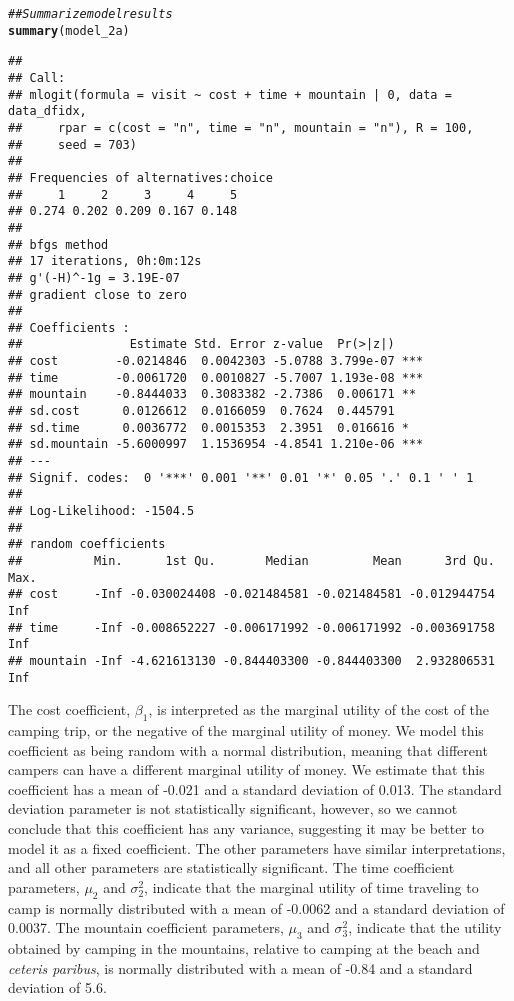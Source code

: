 \documentclass[11pt,letterpaper]{article}\usepackage[]{graphicx}\usepackage[]{color}
\makeatletter
\newcommand{\hlcom}[1]{\textcolor[rgb]{0.678,0.584,0.686}{\textit{#1}}}%
\newcommand{\hlstd}[1]{\textcolor[rgb]{0.345,0.345,0.345}{#1}}%
\newcommand{\hlkwd}[1]{\textcolor[rgb]{0.737,0.353,0.396}{\textbf{#1}}}%
\newenvironment{kframe}{%
 \def\at@end@of@kframe{}%
 \ifinner\ifhmode%
  \def\at@end@of@kframe{\end{minipage}}%
  \begin{minipage}{\columnwidth}%
 \fi\fi%
 \def\FrameCommand##1{\hskip\@totalleftmargin \hskip-\fboxsep
 \colorbox{shadecolor}{##1}\hskip-\fboxsep
     \hskip-\linewidth \hskip-\@totalleftmargin \hskip\columnwidth}%
 \MakeFramed {\advance\hsize-\width
   \@totalleftmargin\z@ \linewidth\hsize
   \@setminipage}}%
 {\par\unskip\endMakeFramed%
 \at@end@of@kframe}
\newenvironment{knitrout}{}{} %
\makeatother
\begin{document}
\begin{enumerate}[label=\alph*., leftmargin=*]
\begin{enumerate}[label=\roman*.]
\begin{knitrout}
\color{fgcolor}\begin{kframe}
\begin{alltt}
\hlcom{## Summarize model results}
\hlkwd{summary}\hlstd{(model_2a)}
\end{alltt}
\begin{verbatim}
## 
## Call:
## mlogit(formula = visit ~ cost + time + mountain | 0, data = data_dfidx, 
##     rpar = c(cost = "n", time = "n", mountain = "n"), R = 100, 
##     seed = 703)
## 
## Frequencies of alternatives:choice
##     1     2     3     4     5 
## 0.274 0.202 0.209 0.167 0.148 
## 
## bfgs method
## 17 iterations, 0h:0m:12s 
## g'(-H)^-1g = 3.19E-07 
## gradient close to zero 
## 
## Coefficients :
##               Estimate Std. Error z-value  Pr(>|z|)    
## cost        -0.0214846  0.0042303 -5.0788 3.799e-07 ***
## time        -0.0061720  0.0010827 -5.7007 1.193e-08 ***
## mountain    -0.8444033  0.3083382 -2.7386  0.006171 ** 
## sd.cost      0.0126612  0.0166059  0.7624  0.445791    
## sd.time      0.0036772  0.0015353  2.3951  0.016616 *  
## sd.mountain -5.6000997  1.1536954 -4.8541 1.210e-06 ***
## ---
## Signif. codes:  0 '***' 0.001 '**' 0.01 '*' 0.05 '.' 0.1 ' ' 1
## 
## Log-Likelihood: -1504.5
## 
## random coefficients
##          Min.      1st Qu.       Median         Mean      3rd Qu. Max.
## cost     -Inf -0.030024408 -0.021484581 -0.021484581 -0.012944754  Inf
## time     -Inf -0.008652227 -0.006171992 -0.006171992 -0.003691758  Inf
## mountain -Inf -4.621613130 -0.844403300 -0.844403300  2.932806531  Inf
\end{verbatim}
\end{kframe}
\end{knitrout}

		The cost coefficient, $\beta_1$, is interpreted as the marginal utility of the cost of the camping trip, or the negative of the marginal utility of money. We model this coefficient as being random with a normal distribution, meaning that different campers can have a different marginal utility of money. We estimate that this coefficient has a mean of -0.021 and a standard deviation of 0.013. The standard deviation parameter is not statistically significant, however, so we cannot conclude that this coefficient has any variance, suggesting it may be better to model it as a fixed coefficient. The other parameters have similar interpretations, and all other parameters are statistically significant. The time coefficient parameters, $\mu_2$ and $\sigma_2^2$, indicate that the marginal utility of time traveling to camp is normally distributed with a mean of -0.0062 and a standard deviation of 0.0037. The mountain coefficient parameters, $\mu_3$ and $\sigma_3^2$, indicate that the utility obtained by camping in the mountains, relative to camping at the beach and \emph{ceteris paribus}, is normally distributed with a mean of -0.84 and a standard deviation of 5.6.
	\end{enumerate}


\end{enumerate}
\end{document}
